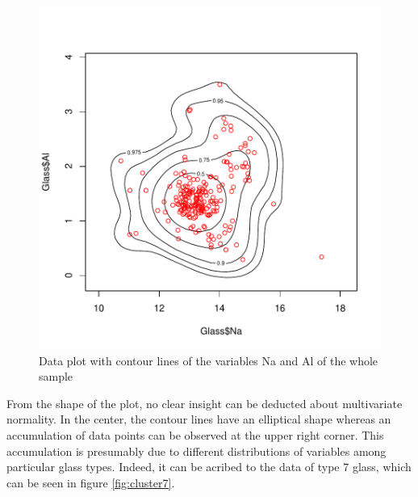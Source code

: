 \documentclass[a4paper, 12pt, titlepage, headsepline, listof = totoc, bibliography = totoc, numbers = noenddot]{scrartcl}
\begin{document}
\begin{figure}[h!]
\includegraphics[width=\textwidth]{report-contourGlassNaAl}
\caption{Data plot with contour lines of the variables Na and Al of the whole sample}
\label{fig:contourGlassNaAl}
\end{figure}


From the shape of the plot, no clear insight can be deducted about multivariate normality. In the center, the contour lines have an elliptical shape whereas an accumulation of data points can be observed at the upper right corner. This accumulation is presumably due to different distributions of variables among particular glass types. Indeed, it can be acribed to the data of type 7 glass, which can be seen in figure \ref{fig:cluster7}.
\end{document}
